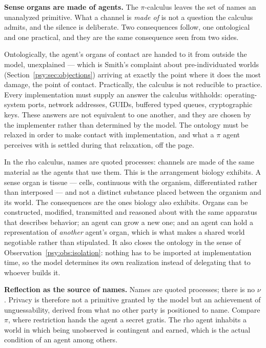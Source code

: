 \textbf{Sense organs are made of agents.}
The $\pi$-calculus leaves the set of names an unanalyzed primitive.
What a channel is \emph{made of} is not a question the calculus
admits, and the silence is deliberate.
Two consequences follow, one ontological and one practical, and they
are the same consequence seen from two sides.

Ontologically, the agent's organs of contact are handed to it from
outside the model, unexplained --- which is Smith's complaint about
pre-individuated worlds (Section~\ref{psy:sec:objections}) arriving
at exactly the point where it does the most damage, the point of
contact.
Practically, the calculus is not reducible to practice.
Every implementation must supply an answer the calculus withholds:
operating-system ports, network addresses, GUIDs, buffered typed
queues, cryptographic keys.
These answers are not equivalent to one another, and they are chosen
by the implementer rather than determined by the model.
The ontology must be relaxed in order to make contact with
implementation, and what a $\pi$ agent perceives with is settled
during that relaxation, off the page.

In the rho calculus, names are quoted processes: channels are made
of the same material as the agents that use them.
This is the arrangement biology exhibits.
A sense organ is tissue --- cells, continuous with the organism,
differentiated rather than interposed --- and not a distinct
substance placed between the organism and its world.
The consequences are the ones biology also exhibits.
Organs can be constructed, modified, transmitted and reasoned about
with the same apparatus that describes behavior; an agent can grow a
new one; and an agent can hold a representation of \emph{another}
agent's organ, which is what makes a shared world negotiable rather
than stipulated.
It also closes the ontology in the sense of
Observation~\ref{psy:obs:isolation}: nothing has to be imported at
implementation time, so the model determines its own realization
instead of delegating that to whoever builds it.

\textbf{Reflection as the source of names.}
Names are quoted processes; there is no $\nu$.
Privacy is therefore not a primitive granted by the model but an
achievement of unguessability, derived from what no other party is
positioned to name.
Compare $\pi$, where restriction hands the agent a secret gratis.
The rho agent inhabits a world in which being unobserved is
contingent and earned, which is the actual condition of an agent
among others.

